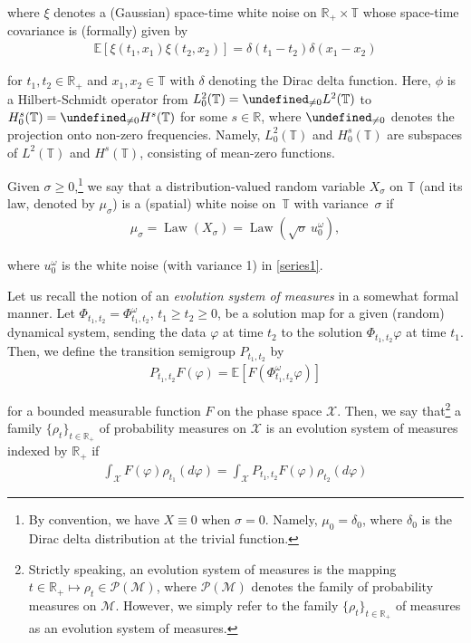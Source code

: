 \documentclass[letterpaper, 11pt,  reqno]{amsart}
\DeclareMathOperator{\Law}{Law}
\newcommand{\1}{\hspace{0.5mm}\text{I}\hspace{0.5mm}}
\newcommand{\noi}{\noindent}
\newcommand{\R}{\mathbb{R}}
\newcommand{\T}{\mathbb{T}}
\let\P= \undefined
\newcommand{\P}{\mathbf{P}}
\newcommand{\E}{\mathbb{E}}
\newcommand{\dl}{\delta}
\newcommand{\s}{\sigma}
\renewcommand{\o}{\omega}
\newcommand{\M}{\mathcal{M}}
\numberwithin{equation}{section}
\numberwithin{theorem}{section}
\begin{document}
\noi
where $\xi$ denotes a (Gaussian) space-time white noise 
on $\R_+\times \T$
whose space-time covariance is (formally) given by 
\begin{align*}
 \E[ \xi(t_1, x_1)\xi(t_2, x_2) ] = \dl (t_1 - t_2) \dl(x_1 - x_2) 
\end{align*} 

\noi
for $t_1, t_2 \in \R_+$  and $x_1, x_2 \in \T$ 
with $\dl$ denoting the Dirac delta function.
Here, 
$\phi$ is a Hilbert-Schmidt operator from $L^2_0(\T) = \P_{\ne 0}L^2(\T)$ to 
$H_0^s(\T)= \P_{\ne 0}H^s(\T)$
for some $s \in \R$, 
where $\P_{\ne 0}$ denotes the projection onto non-zero frequencies.
Namely, 
$L^2_0(\T)$
and $H_0^s(\T)$
are subspaces of $L^2(\T)$ and $H^s(\T)$, 
consisting of mean-zero functions.





Given $\s \ge 0$,\footnote{By convention, we have $X\equiv 0$ when $\s = 0$.
Namely, $\mu_0 = \dl_0$, where $\dl_0$ is the Dirac delta distribution at the trivial function.} we say that a distribution-valued random variable $X_\s$ on $\T$ (and its law, denoted by $\mu_\s$)
is a (spatial) white noise on~$\T$ with variance~$\s$ if
\begin{align}
 \mu_{\s} = \Law(X_\s) = \Law (\sqrt \s\, u_0^\o),
 \label{mu1}
\end{align}

\noi
where $u_0^\o$ is the white noise (with variance 1) in \eqref{series1}.


Let us recall the notion of 
 an {\it evolution system of measures} \cite{DR, DD}
 in a somewhat formal manner.
Let $\Phi_{t_1, t_2}= \Phi_{t_1, t_2}^\o$, $t_1 \ge t_2 \ge 0$,  
be a solution map for a given  (random) dynamical system, 
sending the data $\varphi$ at time $t_2$ to the solution $\Phi_{t_1, t_2}\varphi$ at time $t_1$.
Then, we define the transition semigroup $P_{t_1, t_2}$
by 
\begin{align}
 P_{t_1, t_2}F(\varphi) = \E[ F(\Phi_{t_1, t_2}^\o \varphi)]
\label{trans1}
\end{align} 

\noi
for a bounded measurable function $F$ on the phase space $\mathcal{X}$.
Then, we say that\footnote{Strictly speaking, an evolution system of measures
is the mapping $t \in \R_+ \mapsto \rho_t \in \mathcal{P}(\M)$, 
where $\mathcal{P}(\M)$ denotes the family of probability measures on $\M$.
However, we simply refer to the family $\{\rho_t\}_{t \in \R_+}$ of measures
as an evolution system of measures.} 
a family $\{\rho_t\}_{t \in \R_+}$ of probability measures on $\mathcal{X}$
is an evolution system of measures indexed by $\R_+$ if
\begin{align}
\int_\mathcal{X}  F(\varphi) \rho_{t_1}(d\varphi)= 
 \int_\mathcal{X} P_{t_1, t_2} F(\varphi) \rho_{t_2}(d\varphi)
 \label{evo1}
\end{align}
\end{document}
